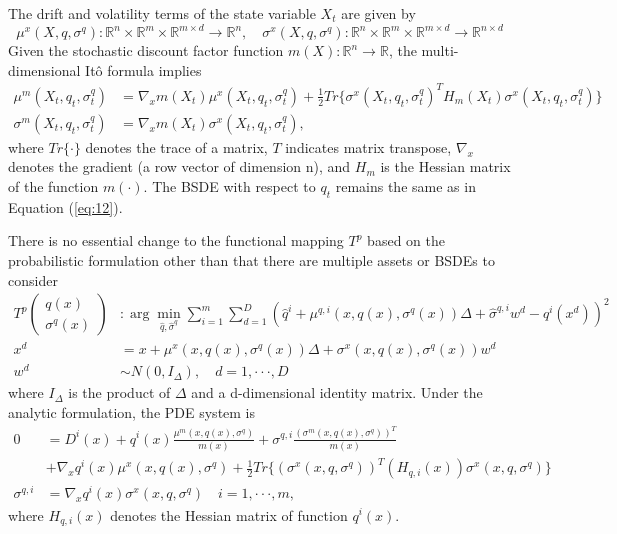 \documentclass{article}
\begin{document}
The drift and volatility terms of the state variable $X_{t}$ are given by
\[
\mu^{x}(X,q,\sigma^{q}):\mathbb{R}^{n}\times\mathbb{R}^{m}\times\mathbb{R}^{m\times d}\rightarrow\mathbb{R}^{n}, \quad \sigma^{x}(X,q,\sigma^{q}):\mathbb{R}^{n}\times\mathbb{R}^{m}\times\mathbb{R}^{m\times d}\rightarrow\mathbb{R}^{n\times d}
\]
Given the stochastic discount factor function $m(X):\mathbb{R}^{n}\rightarrow\mathbb{R}$, the multi-dimensional Itô formula implies
\begin{align*}
\mu^{m}(X_{t},q_{t},\sigma_{t}^{q})&=\nabla_{x}m(X_{t})\mu^{x}(X_{t},q_{t},\sigma_{t}^{q})+\frac{1}{2}Tr\{\sigma^{x}(X_{t},q_{t},\sigma_{t}^{q})^{T}H_{m}(X_{t})\sigma^{x}(X_{t},q_{t},\sigma_{t}^{q})\} \\
\sigma^{m}(X_{t},q_{t},\sigma_{t}^{q})&=\nabla_{x}m(X_{t})\sigma^{x}(X_{t},q_{t},\sigma_{t}^{q}),
\end{align*}
where $Tr\{\cdot\}$ denotes the trace of a matrix, $T$ indicates matrix transpose, $\nabla_{x}$ denotes the gradient (a row vector of dimension n), and $H_{m}$ is the Hessian matrix of the function $m(\cdot)$. The BSDE with respect to $q_{t}$ remains the same as in Equation (\ref{eq:12}).

There is no essential change to the functional mapping $T^{p}$ based on the probabilistic formulation other than that there are multiple assets or BSDEs to consider
\begin{align*}
T^{p}\begin{pmatrix}q(x)\\ \sigma^{q}(x)\end{pmatrix}&:\arg\min_{\hat{q},\hat{\sigma}^{q}}\sum_{i=1}^{m}\sum_{d=1}^{D}(\hat{q}^{i}+\mu^{q,i}(x,q(x),\sigma^{q}(x))\Delta+\hat{\sigma}^{q,i}w^{d}-q^{i}(x^{d}))^{2} \\
x^{d}&=x+\mu^{x}(x,q(x),\sigma^{q}(x))\Delta+\sigma^{x}(x,q(x),\sigma^{q}(x))w^{d} \\
w^{d}&\sim N(0,I_{\Delta}), \quad d=1,\cdot\cdot\cdot,D
\end{align*}
where $I_{\Delta}$ is the product of $\Delta$ and a d-dimensional identity matrix. Under the analytic formulation, the PDE system is
\begin{align}
0&=D^{i}(x)+q^{i}(x)\frac{\mu^{m}(x,q(x),\sigma^{q})}{m(x)}+\sigma^{q,i}\frac{(\sigma^{m}(x,q(x),\sigma^{q}))^{T}}{m(x)} \nonumber \\
&+\nabla_{x}q^{i}(x)\mu^{x}(x,q(x),\sigma^{q})+\frac{1}{2}Tr\{(\sigma^{x}(x,q,\sigma^{q}))^{T}(H_{q,i}(x))\sigma^{x}(x,q,\sigma^{q})\} \label{eq:17} \\
\sigma^{q,i}&=\nabla_{x}q^{i}(x)\sigma^{x}(x,q,\sigma^{q}) \quad i=1,\cdot\cdot\cdot,m, \label{eq:18}
\end{align}
where $H_{q,i}(x)$ denotes the Hessian matrix of function $q^{i}(x)$.
\end{document}
